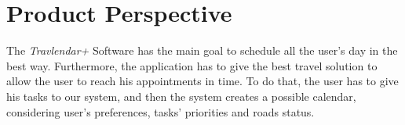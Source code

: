 \section{Product Perspective}
The \emph{Travlendar+} Software has the main goal to schedule all the user's day in the best way. Furthermore, the application has to give the best travel solution to allow the user to reach his appointments in time.
To do that, the user has to give his tasks to our system, and then the system creates a possible calendar, considering user's preferences, tasks' priorities and roads status.
